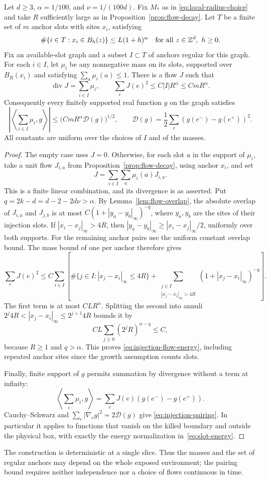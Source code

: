 \begin{proposition}\label{prop:flow-energy}
Let $d\ge3$, $\alpha=1/100$, and $\nu=1/(100d)$.  Fix $M_*$ as in
\eqref{eq:local-radius-choice} and take $R$ sufficiently large as in
Proposition~\ref{prop:flow-decay}.  Let $T$ be a finite
set of $m$ anchor slots with sites $x_i$, satisfying
\[
 \#\{i\in T:x_i\in B_h(z)\}\le L(1+h)^\alpha
 \quad\text{for all }z\in\mathbb Z^d,\ h\ge0.
\]
Fix an available-slot graph and a subset $I\subset T$ of anchors regular
for this graph.  For each $i\in I$, let $\mu_i$ be any nonnegative mass
on its slots, supported over $B_R(x_i)$ and satisfying
$\sum_a\mu_i(a)\le1$.  There is a flow $J$ such that
\begin{equation}\label{eq:injection-flow-energy}
 \operatorname{div}J=\sum_{i\in I}\mu_i,
 \qquad \sum_e J(e)^2\le C|I|R^\alpha\le CmR^\alpha.
\end{equation}
Consequently every finitely supported real function $g$ on the graph
satisfies
\begin{equation}\label{eq:injection-pairing}
 \left|\left\langle\sum_{i\in I}\mu_i,g\right\rangle\right|
 \le \bigl(CmR^\alpha\mathcal D(g)\bigr)^{1/2},
 \qquad \mathcal D(g)=\frac12\sum_e(g(e^-)-g(e^+))^2.
\end{equation}
All constants are uniform over the choices of $I$ and of the masses.
\end{proposition}

\begin{proof}
The empty case uses $J=0$.  Otherwise, for each slot $a$ in the support
of $\mu_i$, take a unit flow $J_{i,a}$ from
Proposition~\ref{prop:flow-decay}, using anchor $x_i$, and set
\[
 J=\sum_{i\in I}\sum_a\mu_i(a)J_{i,a}.
\]
This is a finite linear combination, and its divergence is as asserted.
Put $q=2k-d=d-2-2d\nu>\alpha$.  By
Lemma~\ref{lem:flow-overlap}, the absolute overlap of $J_{i,a}$ and
$J_{j,b}$ is at most $C(1+|y_a-y_b|_\infty)^{-q}$, where $y_a,y_b$
are the sites of their injection slots.  If $|x_i-x_j|_\infty>4R$,
then $|y_a-y_b|_\infty\ge |x_i-x_j|_\infty/2$, uniformly over both
supports.  For the remaining anchor pairs use the uniform constant
overlap bound.  The mass bound of one per anchor therefore gives
\[
 \sum_eJ(e)^2\le C\sum_{i\in I}
 \left[\#\{j\in I:|x_j-x_i|_\infty\le4R\}
 +\sum_{\substack{j\in I\\|x_j-x_i|_\infty>4R}}
     (1+|x_j-x_i|_\infty)^{-q}\right].
\]
The first term is at most $CL R^\alpha$.  Splitting the second into
annuli $2^j4R<|x_j-x_i|_\infty\le2^{j+1}4R$ bounds it by
\[
 CL\sum_{j\ge0}(2^jR)^{\alpha-q}\le C,
\]
because $R\ge1$ and $q>\alpha$.  This proves
\eqref{eq:injection-flow-energy}, including repeated anchor sites since
the growth assumption counts slots.

Finally, finite support of $g$ permits summation by divergence without a
term at infinity:
\[
 \left\langle\sum_i\mu_i,g\right\rangle
 =\sum_e J(e)(g(e^-)-g(e^+)).
\]
Cauchy--Schwarz and $\sum_e|\nabla_e g|^2=2\mathcal D(g)$ give
\eqref{eq:injection-pairing}.  In particular it applies to functions that
vanish on the killed boundary and outside the physical box, with exactly
the energy normalization in~\eqref{eq:slot-energy}.
\end{proof}

The construction is deterministic at a single slice.  Thus the masses
and the set of regular anchors may depend on the whole exposed
environment; the pairing bound requires neither independence nor a
choice of flows continuous in time.
